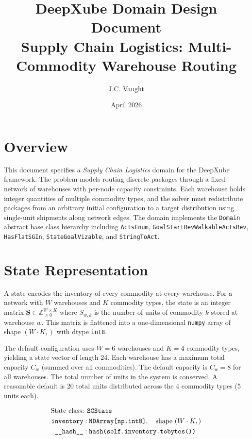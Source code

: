 \documentclass[11pt]{article}
\title{\textbf{DeepXube Domain Design Document} \\ \large Supply Chain Logistics: Multi-Commodity Warehouse Routing}
\author{J.C. Vaught}
\date{April 2026}
\begin{document}
\maketitle

\section{Overview}

This document specifies a \textit{Supply Chain Logistics} domain for the DeepXube framework. The problem models routing discrete packages through a fixed network of warehouses with per-node capacity constraints. Each warehouse holds integer quantities of multiple commodity types, and the solver must redistribute packages from an arbitrary initial configuration to a target distribution using single-unit shipments along network edges. The domain implements the \texttt{Domain} abstract base class hierarchy including \texttt{ActsEnum}, \texttt{GoalStartRevWalkableActsRev}, \texttt{HasFlatSGIn}, \texttt{StateGoalVizable}, and \texttt{StringToAct}.

\section{State Representation}

A state encodes the inventory of every commodity at every warehouse. For a network with $W$ warehouses and $K$ commodity types, the state is an integer matrix $\mathbf{S} \in \mathbb{Z}_{\geq 0}^{W \times K}$ where $S_{w,k}$ is the number of units of commodity $k$ stored at warehouse $w$. This matrix is flattened into a one-dimensional \texttt{numpy} array of shape $(W \cdot K,)$ with dtype \texttt{int8}.

The default configuration uses $W = 6$ warehouses and $K = 4$ commodity types, yielding a state vector of length 24. Each warehouse has a maximum total capacity $C_w$ (summed over all commodities). The default capacity is $C_w = 8$ for all warehouses. The total number of units in the system is conserved. A reasonable default is 20 total units distributed across the 4 commodity types (5 units each).

\begin{align}
    \text{State class: } & \texttt{SCState} \notag \\
    \texttt{inventory}: & \; \texttt{NDArray[np.int8]}, \quad \text{shape } (W \cdot K,) \notag \\
    \texttt{\_\_hash\_\_}: & \; \texttt{hash(self.inventory.tobytes())} \notag
\end{align}
\end{document}
